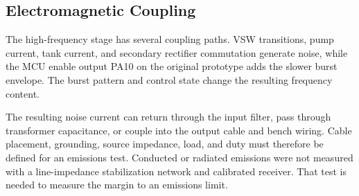 \subsection{Electromagnetic Coupling}
\label{sec:hw-emi}

The high-frequency stage has several coupling paths. VSW transitions, pump current, tank current, and secondary rectifier commutation generate noise, while the MCU enable output PA10 on the original prototype adds the slower burst envelope. The burst pattern and control state change the resulting frequency content.

The resulting noise current can return through the input filter, pass through transformer capacitance, or couple into the output cable and bench wiring. Cable placement, grounding, source impedance, load, and duty must therefore be defined for an emissions test. Conducted or radiated emissions were not measured with a line-impedance stabilization network and calibrated receiver. That test is needed to measure the margin to an emissions limit.
